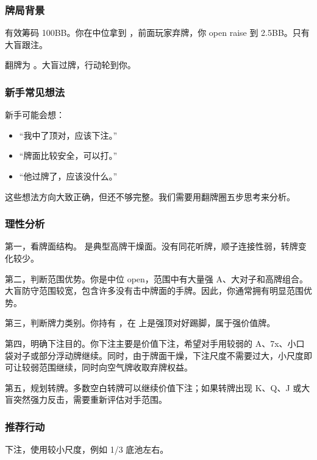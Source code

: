 \subsubsection*{牌局背景}

有效筹码 100BB。你在中位拿到 ，前面玩家弃牌，你 open raise 到 2.5BB。只有大盲跟注。

翻牌为 。大盲过牌，行动轮到你。

\subsubsection*{新手常见想法}

新手可能会想：

\begin{itemize}
\item “我中了顶对，应该下注。”
\item “牌面比较安全，可以打。”
\item “他过牌了，应该没什么。”
\end{itemize}

这些想法方向大致正确，但还不够完整。我们需要用翻牌圈五步思考来分析。

\subsubsection*{理性分析}

第一，看牌面结构。 是典型高牌干燥面。没有同花听牌，顺子连接性弱，转牌变化较少。

第二，判断范围优势。你是中位 open，范围中有大量强 A、大对子和高牌组合。大盲防守范围较宽，包含许多没有击中牌面的手牌。因此，你通常拥有明显范围优势。

第三，判断牌力类别。你持有 ，在  上是强顶对好踢脚，属于强价值牌。

第四，明确下注目的。你下注主要是价值下注，希望对手用较弱的 A、7x、小口袋对子或部分浮动牌继续。同时，由于牌面干燥，下注尺度不需要过大，小尺度即可让较弱范围继续，同时向空气牌收取弃牌权益。

第五，规划转牌。多数空白转牌可以继续价值下注；如果转牌出现 K、Q、J 或大盲突然强力反击，需要重新评估对手范围。

\subsubsection*{推荐行动}

下注，使用较小尺度，例如 1/3 底池左右。

